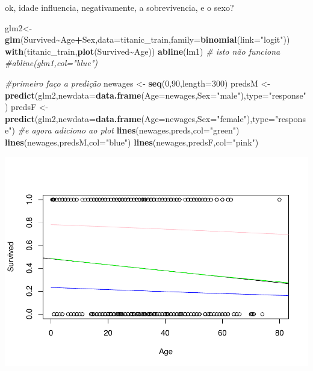 \documentclass[
]{book}
\newenvironment{Shaded}{\begin{snugshade}}{\end{snugshade}}
\newcommand{\AttributeTok}[1]{\textcolor[rgb]{0.13,0.29,0.53}{#1}}
\newcommand{\CommentTok}[1]{\textcolor[rgb]{0.56,0.35,0.01}{\textit{#1}}}
\newcommand{\DecValTok}[1]{\textcolor[rgb]{0.00,0.00,0.81}{#1}}
\newcommand{\FunctionTok}[1]{\textcolor[rgb]{0.13,0.29,0.53}{\textbf{#1}}}
\newcommand{\NormalTok}[1]{#1}
\newcommand{\OtherTok}[1]{\textcolor[rgb]{0.56,0.35,0.01}{#1}}
\newcommand{\SpecialCharTok}[1]{\textcolor[rgb]{0.81,0.36,0.00}{\textbf{#1}}}
\newcommand{\StringTok}[1]{\textcolor[rgb]{0.31,0.60,0.02}{#1}}
\begin{document}
ok, idade influencia, negativamente, a sobrevivencia, e o sexo?

\begin{Shaded}
\begin{Highlighting}[]
\NormalTok{glm2}\OtherTok{\textless{}{-}}\FunctionTok{glm}\NormalTok{(Survived}\SpecialCharTok{\textasciitilde{}}\NormalTok{Age}\SpecialCharTok{+}\NormalTok{Sex,}\AttributeTok{data=}\NormalTok{titanic\_train,}\AttributeTok{family=}\FunctionTok{binomial}\NormalTok{(}\AttributeTok{link=}\StringTok{"logit"}\NormalTok{))}
\FunctionTok{with}\NormalTok{(titanic\_train,}\FunctionTok{plot}\NormalTok{(Survived}\SpecialCharTok{\textasciitilde{}}\NormalTok{Age))}
\FunctionTok{abline}\NormalTok{(lm1)}
\CommentTok{\# isto não funciona}
\CommentTok{\#abline(glm1,col="blue")}

\CommentTok{\#primeiro faço a predição}
\NormalTok{newages }\OtherTok{\textless{}{-}} \FunctionTok{seq}\NormalTok{(}\DecValTok{0}\NormalTok{,}\DecValTok{90}\NormalTok{,}\AttributeTok{length=}\DecValTok{300}\NormalTok{)}
\NormalTok{predsM }\OtherTok{\textless{}{-}} \FunctionTok{predict}\NormalTok{(glm2,}\AttributeTok{newdata=}\FunctionTok{data.frame}\NormalTok{(}\AttributeTok{Age=}\NormalTok{newages,}\AttributeTok{Sex=}\StringTok{"male"}\NormalTok{),}\AttributeTok{type=}\StringTok{"response"}\NormalTok{)}
\NormalTok{predsF }\OtherTok{\textless{}{-}} \FunctionTok{predict}\NormalTok{(glm2,}\AttributeTok{newdata=}\FunctionTok{data.frame}\NormalTok{(}\AttributeTok{Age=}\NormalTok{newages,}\AttributeTok{Sex=}\StringTok{"female"}\NormalTok{),}\AttributeTok{type=}\StringTok{"response"}\NormalTok{)}
\CommentTok{\#e agora adiciono ao plot}
\FunctionTok{lines}\NormalTok{(newages,preds,}\AttributeTok{col=}\StringTok{"green"}\NormalTok{)}
\FunctionTok{lines}\NormalTok{(newages,predsM,}\AttributeTok{col=}\StringTok{"blue"}\NormalTok{)}
\FunctionTok{lines}\NormalTok{(newages,predsF,}\AttributeTok{col=}\StringTok{"pink"}\NormalTok{)}
\end{Highlighting}
\end{Shaded}

\includegraphics{ECOMODbook_files/figure-latex/unnamed-chunk-53-1.pdf}
\end{document}
